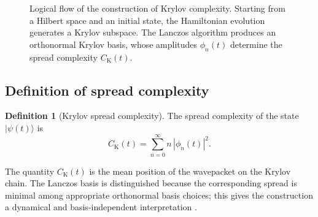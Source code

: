 \documentclass[11pt,a4paper]{article}
\theoremstyle{plain}
\theoremstyle{definition}
\newtheorem{definition}[proposition]{Definition}
\theoremstyle{remark}
\newcommand{\Krylov}{\mathcal K}
\newcommand{\Ck}{C_{\mathrm K}}
\begin{document}
\begin{figure}[ht]
\centering
{}
\caption{Logical flow of the construction of Krylov complexity. Starting from a Hilbert space and an initial state, the Hamiltonian evolution generates a Krylov subspace. The Lanczos algorithm produces an orthonormal Krylov basis, whose amplitudes $\phi_n(t)$ determine the spread complexity $\Ck(t)$.}
\label{fig:flowchart}
\end{figure}

\subsection{Definition of spread complexity}

\begin{definition}[Krylov spread complexity]
The spread complexity of the state $|\psi(t)\rangle$ is
\begin{equation*}
\Ck(t)
=
\sum_{n=0}^\infty n\,|\phi_n(t)|^2.
\end{equation*}
\end{definition}

The quantity $\Ck(t)$ is the mean position of the wavepacket on the Krylov chain. The Lanczos basis is distinguished because the corresponding spread is minimal among appropriate orthonormal basis choices; this gives the construction a dynamical and basis-independent interpretation \cite{Balasubramanian:2022tpr}.
\end{document}
